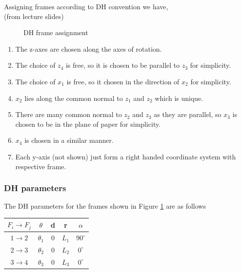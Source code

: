 \documentclass[12pt]{article}
\newcommand{\fromlectures}{{\\ \color{blue} \hspace*{\fill}(from lecture slides)} \\}
\begin{document}
Assigning frames according to DH convention we have,
\fromlectures
\begin{figure}[h]
  \centering
  \caption{DH frame assignment}
  \label{fig:q1.2}
\end{figure}
\begin{enumerate}[nolistsep]
  \item The z-axes are chosen along the axes of rotation.
  \item The choice of $z_4$ is free, so it is chosen to be parallel to $z_3$ for simplicity.
  \item The choice of $x_1$ is free, so it chosen in the direction of $x_2$ for simplicity.
  \item $x_2$ lies along the common normal to $z_1$ and $z_2$ which is unique.
  \item There are many common normal to $z_2$ and $z_3$ as they are parallel, so $x_3$ is chosen to be in the plane of paper for simplicity.
  \item $x_4$ is chosen in a similar manner.
  \item Each y-axis (not shown) just form a right handed coordinate system with respective frame.
\end{enumerate}

\subsubsection*{DH parameters}
The DH parameters for the frames shown in Figure \ref{fig:q1.2} are as follows
\begin{center}
\begin{tabular}{ c | c c c c }
 \hline
 $F_i \to F_j$ & $\theta$ & d & r & $\alpha$ \\
 \hline
 $1 \to 2$ & $\theta_1$ & 0 & $L_1$ & $90^{\circ}$ \\
 $2 \to 3$ & $\theta_2$ & 0 & $L_2$ & $0^{\circ}$ \\
 $3 \to 4$ & $\theta_3$ & 0 & $L_3$ & $0^{\circ}$ \\
 \hline
\end{tabular}
\end{center}
\end{document}
